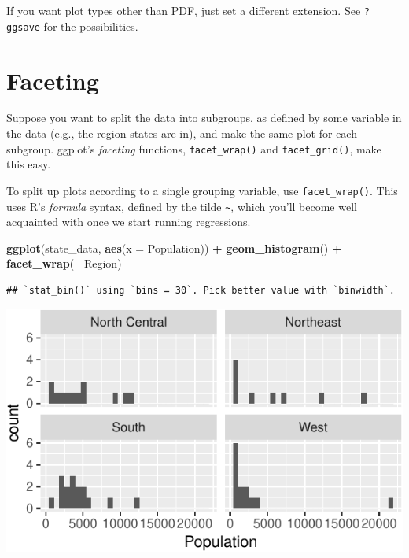 \documentclass[12pt,oneside,openany]{book}
\newenvironment{Shaded}{\begin{snugshade}}{\end{snugshade}}
\newcommand{\KeywordTok}[1]{\textcolor[rgb]{0.13,0.29,0.53}{\textbf{#1}}}
\newcommand{\DataTypeTok}[1]{\textcolor[rgb]{0.13,0.29,0.53}{#1}}
\newcommand{\StringTok}[1]{\textcolor[rgb]{0.31,0.60,0.02}{#1}}
\newcommand{\OperatorTok}[1]{\textcolor[rgb]{0.81,0.36,0.00}{\textbf{#1}}}
\newcommand{\NormalTok}[1]{#1}
\begin{document}
If you want plot types other than PDF, just set a different extension.
See \texttt{?ggsave} for the possibilities.

\section{Faceting}\label{faceting}

Suppose you want to split the data into subgroups, as defined by some
variable in the data (e.g., the region states are in), and make the same
plot for each subgroup. ggplot's \emph{faceting} functions,
\texttt{facet\_wrap()} and \texttt{facet\_grid()}, make this easy.

To split up plots according to a single grouping variable, use
\texttt{facet\_wrap()}. This uses R's \emph{formula} syntax, defined by
the tilde \texttt{\textasciitilde{}}, which you'll become well
acquainted with once we start running regressions.

\begin{Shaded}
\begin{Highlighting}[]
\KeywordTok{ggplot}\NormalTok{(state_data, }\KeywordTok{aes}\NormalTok{(}\DataTypeTok{x =}\NormalTok{ Population)) }\OperatorTok{+}
\StringTok{  }\KeywordTok{geom_histogram}\NormalTok{() }\OperatorTok{+}
\StringTok{  }\KeywordTok{facet_wrap}\NormalTok{(}\OperatorTok{~}\StringTok{ }\NormalTok{Region)}
\end{Highlighting}
\end{Shaded}

\begin{verbatim}
## `stat_bin()` using `bins = 30`. Pick better value with `binwidth`.
\end{verbatim}

\includegraphics{pdaps_files/figure-latex/facet-wrap-1.pdf}
\end{document}
